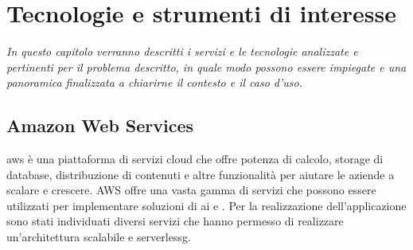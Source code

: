 \chapter{Tecnologie e strumenti di interesse}
\label{cap:tecnologie}
\emph{In questo capitolo verranno descritti i servizi e le tecnologie analizzate e pertinenti per il problema descritto, in quale modo possono essere impiegate e una panoramica finalizzata a chiarirne il contesto e il caso d'uso.}

\section{Amazon Web Services}
\gls{aws} è una piattaforma di servizi cloud che offre potenza di calcolo, storage di database, distribuzione di contenuti e altre funzionalità per aiutare le aziende a scalare e crescere. AWS offre una vasta gamma di servizi che possono essere utilizzati per implementare soluzioni di \gls{ai} e . Per la realizzazione dell'applicazione sono stati individuati diversi servizi che hanno permesso di realizzare un'architettura scalabile e \gls{serverlessg}.

